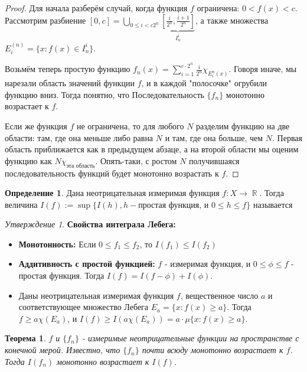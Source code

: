 \documentclass[a4paper]{article}
\theoremstyle{indented}
\newtheorem{theorem}{Теорема}
\theoremstyle{definition}
\newtheorem{defn}{Определение}
\theoremstyle{remark}
\newtheorem{stat}{Утверждение}
\DeclareMathOperator{\ra}{\rightarrow}
\DeclareMathOperator{\RR}{\mathbb{R}}
\begin{document}
\begin{proof}
Для начала разберём случай, когда функция $f$ ограничена: $0 < f(x) < c$. Рассмотрим разбиение $[0, c] = \bigcup_{0 \leq i <c2^n } \underbrace{\left [ \frac{i}{2^n}, \frac{i+1}{2^n} \right ]}_{I^i_n}$, а также множества $E^{(n)}_i = \{x : f(x) \in I^i_n\}$. 
 
Возьмём теперь простую функцию $f_n(x) = \sum_{i=1}^{c \cdot 2^n} \frac{i}{2^n} \chi_{E^{n}_i(x)}$. Говоря иначе, мы нарезали область значений функции $f$, и в каждой "полосочке" огрубили функцию вниз. Тогда понятно, что Последовательность $\{f_n\}$ монотонно возрастает к $f$.
 
Если же функция $f$ не ограничена, то для любого $N$ разделим функцию на две области: там, где она меньше либо равна $N$ и там, где она больше, чем $N$. Первая область приближается как в предыдущем абзаце, а на второй области мы оценим функцию как $N \chi_{\text{эта область}}$. Опять-таки, с ростом $N$ получившаяся последовательность функций будет монотонно возрастать к $f$.
\end{proof}
\begin{defn}
Дана неотрицательная измеримая функция $f: X \ra \RR$. Тогда величина $I(f):=\sup \{I(h), h - \text{простая функция, и } 0 \leq h \leq f\}$ называется 
\end{defn}
\begin{stat}
\textbf{Свойства интеграла Лебега:}
 
\begin{itemize}
 
    \item \textbf{Монотонность:} Если $0 \leq f_1 \leq f_2$, то $I(f_1) \leq I(f_2)$
    \item \textbf{Аддитивность с простой функцией: } $f$ - измеримая функция, и $0 \leq \phi \leq f$ - простая функция. Тогда $I(f)=I(f-\phi)+I(\phi)$.
    \item {} Даны неотрицательная измеримая функция $f$, вещественное число $a$ и соответствующее множество Лебега $E_a=\{x: f(x) \geq a\}$. Тогда $f \geq a \chi(E_a)$, и $I(f) \geq I(a \chi(E_a)) = a \cdot \mu\{x: f(x) \geq a\}$.
\end{itemize}
\end{stat}
\begin{theorem}
$f$ и $\{f_n\}$ - измеримые неотрицательные функции на пространстве с конечной мерой. Известно, что $\{f_n\}$ почти всюду монотонно возрастает к $f$. Тогда $I(f_n)$ монотонно возрастает к $I(f)$.
\end{theorem}
\end{document}
